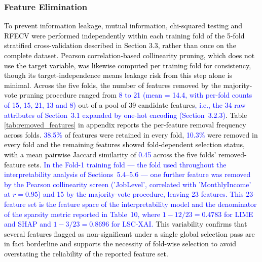 \documentclass[a4paper,fleqn]{cas-sc}
\begin{document}
\subsubsection{Feature Elimination}
\textcolor{black}{To prevent information leakage, mutual information, chi-squared testing and RFECV were performed independently within each training fold of the 5-fold stratified cross-validation described in Section 3.3, rather than once on the complete dataset. Pearson correlation-based collinearity pruning, which does not use the target variable, was likewise computed per training fold for consistency, though its target-independence means leakage risk from this step alone is minimal. Across the five folds, the number of features removed by the majority-vote pruning procedure ranged from \textcolor{blue}{8 to 21 (mean = 14.4, with per-fold counts of 15, 15, 21, 13 and 8)} out of a pool of 39 candidate features\textcolor{blue}{, i.e., the 34 raw attributes of Section~3.1 expanded by one-hot encoding (Section~3.2.3)}. Table \ref{tab:removed_features} in appendix reports the per-feature removal frequency across folds. \textcolor{blue}{38.5\%} of features were retained in every fold, \textcolor{blue}{10.3\%} were removed in every fold and the remaining features showed fold-dependent selection status, with a mean pairwise Jaccard similarity of \textcolor{blue}{0.45} across the five folds' removed-feature sets. \textcolor{blue}{In the Fold-1 training fold --- the fold used throughout the interpretability analysis of Sections~5.4--5.6 --- one further feature was removed by the Pearson collinearity screen ('JobLevel', correlated with 'MonthlyIncome' at $r = 0.95$) and 15 by the majority-vote procedure, leaving 23 features. This 23-feature set is the feature space of the interpretability model and the denominator of the sparsity metric reported in Table~10, where $1 - 12/23 = 0.4783$ for LIME and SHAP and $1 - 3/23 = 0.8696$ for LSC-XAI.} This variability confirms that several features flagged as non-significant under a single global selection pass are in fact borderline and supports the necessity of fold-wise selection to avoid overstating the reliability of the reported feature set.}
\end{document}
